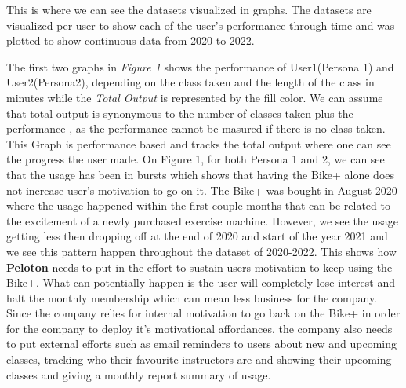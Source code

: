 \documentclass[
]{article}
\begin{document}
This is where we can see the datasets visualized in graphs. The datasets are visualized per user to show each of the user's performance through time and was plotted to show continuous data from 2020 to 2022.

The first two graphs in \emph{Figure 1} shows the performance of User1(Persona 1) and User2(Persona2), depending on the class taken and the length of the class in minutes while the \emph{Total Output} is represented by the fill color. We can assume that total output is synonymous to the number of classes taken plus the performance , as the performance cannot be masured if there is no class taken. This Graph is performance based and tracks the total output where one can see the progress the user made. On Figure 1, for both Persona 1 and 2, we can see that the usage has been in bursts which shows that having the Bike+ alone does not increase user's motivation to go on it. The Bike+ was bought in August 2020 where the usage happened within the first couple months that can be related to the excitement of a newly purchased exercise machine. However, we see the usage getting less then dropping off at the end of 2020 and start of the year 2021 and we see this pattern happen throughout the dataset of 2020-2022. This shows how \textbf{Peloton} needs to put in the effort to sustain users motivation to keep using the Bike+. What can potentially happen is the user will completely lose interest and halt the monthly membership which can mean less business for the company. Since the company relies for internal motivation to go back on the Bike+ in order for the company to deploy it's motivational affordances, the company also needs to put external efforts such as email reminders to users about new and upcoming classes, tracking who their favourite instructors are and showing their upcoming classes and giving a monthly report summary of usage.
\end{document}
